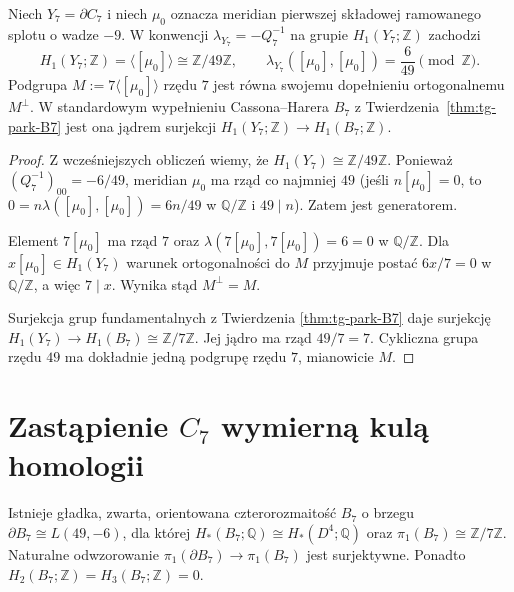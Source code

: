 \begin{lemat}
\label{lem:tg-park-metabolizer}
Niech $Y_7=\partial C_7$ i niech $\mu_0$
oznacza meridian pierwszej składowej
ramowanego splotu o wadze $-9$.
W konwencji $\lambda_{Y_7}=-Q_7^{-1}$
na grupie $H_1(Y_7;\mathbb Z)$ zachodzi
\[
H_1(Y_7;\mathbb Z)=\langle[\mu_0]\rangle
\cong\mathbb Z/49\mathbb Z,\qquad
\lambda_{Y_7}([\mu_0],[\mu_0])
=\frac6{49}\pmod{\mathbb Z}.
\]
Podgrupa $M:=7\langle[\mu_0]\rangle$
rzędu $7$ jest równa swojemu dopełnieniu
ortogonalnemu $M^\perp$. W standardowym
wypełnieniu Cassona--Harera $B_7$
z Twierdzenia~\ref{thm:tg-park-B7}
jest ona jądrem surjekcji
$H_1(Y_7;\mathbb Z)\to H_1(B_7;\mathbb Z)$.
\end{lemat}

\begin{proof}
Z wcześniejszych obliczeń wiemy, że
$H_1(Y_7)\cong\mathbb Z/49\mathbb Z$.
Ponieważ $(Q_7^{-1})_{00}=-6/49$,
meridian $\mu_0$ ma rząd co najmniej $49$
(jeśli $n[\mu_0]=0$, to
$0=n\lambda([\mu_0],[\mu_0])=6n/49$
w $\mathbb Q/\mathbb Z$ i $49\mid n$).
Zatem jest generatorem.

Element $7[\mu_0]$ ma rząd $7$ oraz
$\lambda(7[\mu_0],7[\mu_0])
=6=0$ w $\mathbb Q/\mathbb Z$.
Dla $x[\mu_0]\in H_1(Y_7)$
warunek ortogonalności do $M$
przyjmuje postać
$6x/7=0$ w $\mathbb Q/\mathbb Z$,
a więc $7\mid x$. Wynika stąd $M^\perp=M$.

Surjekcja grup fundamentalnych z Twierdzenia
\ref{thm:tg-park-B7} daje surjekcję
$H_1(Y_7)\to H_1(B_7)\cong\mathbb Z/7\mathbb Z$.
Jej jądro ma rząd $49/7=7$.
Cykliczna grupa rzędu $49$ ma dokładnie
jedną podgrupę rzędu $7$, mianowicie $M$.
\end{proof}

\section{Zastąpienie \texorpdfstring{$C_7$}{C7} wymierną kulą homologii}
\label{sec:tg-park-blowdown}

\begin{twierdzenie}
\label{thm:tg-park-B7}
Istnieje gładka, zwarta, orientowana czterorozmaitość
$B_7$ o brzegu $\partial B_7\cong L(49,-6)$, dla której
$H_*(B_7;\mathbb Q)\cong H_*(D^4;\mathbb Q)$ oraz
$\pi_1(B_7)\cong\mathbb Z/7\mathbb Z$.
Naturalne odwzorowanie
$\pi_1(\partial B_7)\to\pi_1(B_7)$ jest surjektywne.
Ponadto $H_2(B_7;\mathbb Z)=H_3(B_7;\mathbb Z)=0$.
\end{twierdzenie}

